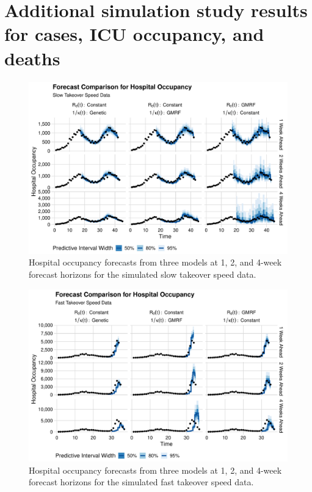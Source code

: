 \section{Additional simulation study results for cases, ICU occupancy, and deaths}
\label{ch_5:sec:sim_cases_icu_death}

\begin{figure}
    \centering
    \includegraphics[width=1.0\columnwidth]{simulated_forecast_comparison_data_hospitalizations_slow_plot}
\caption[Hospital occupancy forecasts for simulated slow takeover speed data.]{Hospital occupancy forecasts from three models at 1, 2, and 4-week forecast horizons for the simulated slow takeover speed data.}
    \label{ch_5:fig:simulated_forecast_comparison_data_hospitalizations_slow_plot}
\end{figure}

\begin{figure}
    \centering
    \includegraphics[width=1.0\columnwidth]{simulated_forecast_comparison_data_hospitalizations_fast_plot}
\caption[Hospital occupancy forecasts for simulated fast takeover speed data.]{Hospital occupancy forecasts from three models at 1, 2, and 4-week forecast horizons for the simulated fast takeover speed data.}
    \label{ch_5:fig:simulated_forecast_comparison_data_hospitalizations_fast_plot}
\end{figure}

